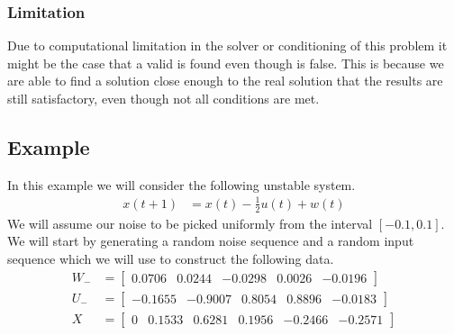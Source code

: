 \subsubsection*{Limitation}
Due to computational limitation in the solver or conditioning of this problem it might be the case that a valid  is found even though  is false. This is because we are able to find a solution close enough to the real solution that the results are still satisfactory, even though not all conditions are met. 

\subsection{Example} \label{ExampleQS}
In this example we will consider the following unstable system.
\begin{align*}
	x(t+1) &= x(t) - \frac{1}{2}u(t) + w(t) 
\end{align*}
We will assume our noise to be picked uniformly from the interval $[-0.1 , 0.1]$. We will start by generating a random noise sequence and a random input sequence which we will use to construct the following data.
\begin{align*}
	W_- &= \begin{bmatrix}  0.0706 &  0.0244 & -0.0298 & 0.0026 & -0.0196 \end{bmatrix} \\
	U_- &= \begin{bmatrix} -0.1655 & -0.9007 &  0.8054 & 0.8896 & -0.0183 \end{bmatrix} \\
	X   &= \begin{bmatrix}     0   &  0.1533 &  0.6281 & 0.1956 & -0.2466 & -0.2571 \end{bmatrix} \\
\end{align*}

